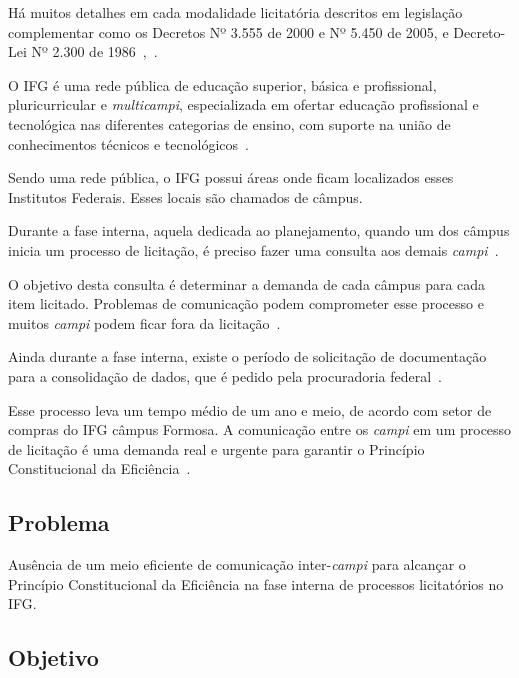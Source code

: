 Há muitos detalhes em cada modalidade licitatória descritos em legislação complementar como os Decretos Nº 3.555 de 2000 e Nº 5.450 de 2005, e Decreto-Lei Nº 2.300 de 1986~\cite{l3555},~\cite{l5450}.

O IFG é uma rede pública de educação superior, básica e profissional, pluricurricular e \textit{multicampi}, especializada em ofertar educação profissional e tecnológica nas diferentes categorias de ensino, com suporte na união de conhecimentos técnicos e tecnológicos~\cite{apresentacao}.

Sendo uma rede pública, o IFG possui áreas onde ficam localizados esses Institutos Federais.
Esses locais são chamados de câmpus.

Durante a fase interna, aquela dedicada ao planejamento, quando um dos câmpus inicia um processo de licitação, é preciso fazer uma consulta aos demais \textit{campi}~\cite{carvalho2013manual}. 

O objetivo desta consulta é determinar a demanda de cada câmpus para cada item licitado. 
Problemas de comunicação podem comprometer esse processo e muitos \textit{campi} podem ficar fora da licitação~\cite{fernandes2005politicas}.

Ainda durante a fase interna, existe o período de solicitação de documentação para a consolidação de dados, que é pedido pela procuradoria federal~\cite{de2007curso}. 

Esse processo leva um tempo médio de um ano e meio, de acordo com setor de compras do IFG câmpus Formosa.
A comunicação entre os \textit{campi} em um processo de licitação é uma demanda real e urgente para garantir o Princípio Constitucional da Eficiência~\cite{l1988}.

\subsection*{Problema}
Ausência de um meio eficiente de comunicação inter-\textit{campi} para alcançar o Princípio Constitucional da Eficiência na fase interna de processos licitatórios no IFG.


\subsection*{Objetivo}

